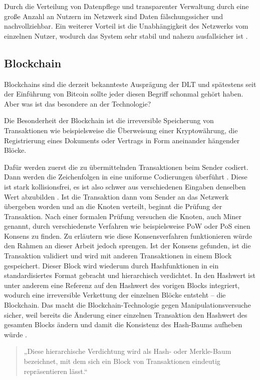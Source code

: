 Durch die Verteilung von Datenpflege und transparenter Verwaltung durch eine große Anzahl an Nutzern im Netzwerk sind Daten fälschungssicher und nachvollziehbar.
Ein weiterer Vorteil ist die Unabhängigkeit des Netzwerks vom einzelnen Nutzer, wodurch das System sehr stabil und nahezu ausfallsicher ist \parencite[vgl.][3]{Overcamp.2019}.

\subsection{Blockchain}

Blockchains sind die derzeit bekannteste Ausprägung der \ac{DLT} und spätestens seit der Einführung von Bitcoin sollte jeder diesen Begriff schonmal gehört haben. Aber was ist das besondere an der Technologie?

Die Besonderheit der Blockchain ist die irreversible Speicherung von Transaktionen wie beispielsweise die Überweisung einer Kryptowährung, die Registrierung eines Dokuments oder Vertrags in Form aneinander hängender Blöcke. 

Dafür werden zuerst die zu übermittelnden Transaktionen beim Sender codiert. 
Dann werden die Zeichenfolgen in eine uniforme Codierungen überführt \parencite[vgl.][313]{Neugebauer.2018}.
Diese ist stark kollisionsfrei, es ist also schwer aus verschiedenen Eingaben denselben Wert abzubilden \parencite[vgl.][]{tuchemblockchain}.
Ist die Transaktion dann vom Sender an das Netzwerk übergeben worden und an die Knoten verteilt, beginnt die Prüfung der Transaktion.
Nach einer formalen Prüfung versuchen die Knoten, auch Miner genannt, durch verschiedenste Verfahren wie beispielsweise \ac{PoW} oder \ac{PoS} einen Konsens zu finden.
Zu erläutern wie diese Konsensverfahren funktionieren würde den Rahmen an dieser Arbeit jedoch sprengen. 
Ist der Konsens gefunden, ist die Transaktion validiert und wird mit anderen Transaktionen in einem Block gespeichert.
Dieser Block wird wiederum durch Hashfunktionen in ein standardisiertes Format gebracht und hierarchisch verdichtet.
In den Hashwert ist unter anderem eine Referenz auf den Hashwert des vorigen Blocks integriert, wodurch eine irreversible Verkettung der einzelnen Blöcke entsteht -- die Blockchain.
Das macht die Blockchain-Technologie gegen Manipulationsversuche sicher, weil bereits die Änderung einer einzelnen Transaktion den Hashwert
des gesamten Blocks ändern und damit die Konsistenz des Hash-Baums aufheben würde \parencite[vgl.][313]{Neugebauer.2018}.

    \begin{quote}
        „Diese hierarchische Verdichtung wird als Hash- oder Merkle-Baum bezeichnet, mit dem sich ein Block von Transaktionen eindeutig repräsentieren lässt.“
        \parencite[313]{Neugebauer.2018}
    \end{quote}

